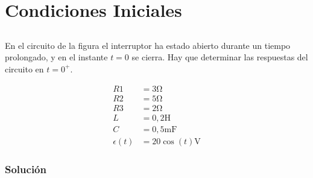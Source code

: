 \documentclass[12pt]{article}
\begin{document}
\title{}

\section{Condiciones Iniciales}

\subsection{}
En el circuito de la figura el interruptor ha estado abierto durante un tiempo
prolongado, y en el instante $t = 0$ se cierra. Hay que determinar las
respuestas del circuito en $t = 0^+$.

\begin{minipage}{0.5\linewidth}
\end{minipage}
\begin{minipage}{0.5\linewidth}
  \begin{align*}
    R1 &= 3\unit{\ohm}\\
    R2 &= 5\unit{\ohm}\\
    R3 &= 2\unit{\ohm}\\
    L &= 0,2\unit{\henry}\\
    C &= 0,5\unit{\milli\farad}\\
    \epsilon(t) &= 20\cos(t)\unit{\volt}
  \end{align*}
\end{minipage}

\subsubsection*{Solución}
\end{document}
